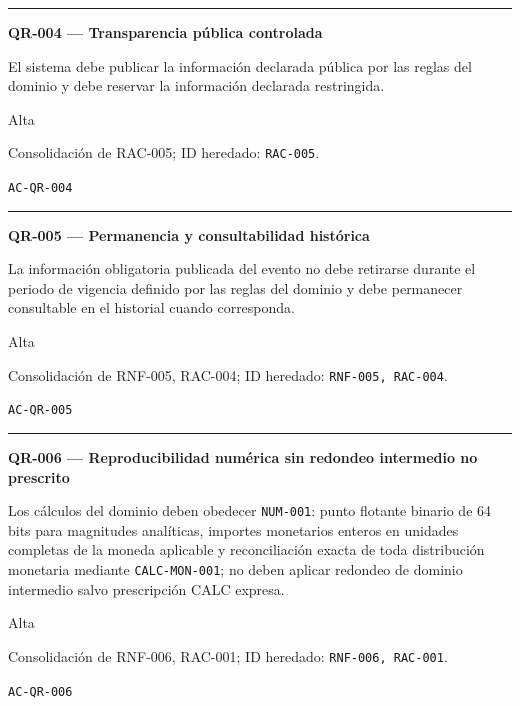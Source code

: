 \documentclass[10pt,letterpaper]{article}
\begin{document}
\vspace{0.25em}\hrule\vspace{0.65em}
\noindent\textbf{QR-004 --- Transparencia pública controlada}\par
\begin{description}[style=nextline,leftmargin=3.15cm,labelwidth=2.8cm,font=\normalfont\bfseries]
\item[Obligación] El sistema debe publicar la información declarada pública por las reglas del dominio y debe reservar la información declarada restringida.
\item[Prioridad] Alta
\item[Procedencia] Consolidación de RAC-005; ID heredado: \texttt{RAC-005}.
\item[Verificación] \texttt{AC-QR-004}
\end{description}
\vspace{0.25em}\hrule\vspace{0.65em}
\noindent\textbf{QR-005 --- Permanencia y consultabilidad histórica}\par
\begin{description}[style=nextline,leftmargin=3.15cm,labelwidth=2.8cm,font=\normalfont\bfseries]
\item[Obligación] La información obligatoria publicada del evento no debe retirarse durante el periodo de vigencia definido por las reglas del dominio y debe permanecer consultable en el historial cuando corresponda.
\item[Prioridad] Alta
\item[Procedencia] Consolidación de RNF-005, RAC-004; ID heredado: \texttt{RNF-005, RAC-004}.
\item[Verificación] \texttt{AC-QR-005}
\end{description}
\vspace{0.25em}\hrule\vspace{0.65em}
\noindent\textbf{QR-006 --- Reproducibilidad numérica sin redondeo intermedio no prescrito}\par
\begin{description}[style=nextline,leftmargin=3.15cm,labelwidth=2.8cm,font=\normalfont\bfseries]
\item[Obligación] Los cálculos del dominio deben obedecer \texttt{NUM-001}: punto flotante binario de 64 bits para magnitudes analíticas, importes monetarios enteros en unidades completas de la moneda aplicable y reconciliación exacta de toda distribución monetaria mediante \texttt{CALC-MON-001}; no deben aplicar redondeo de dominio intermedio salvo prescripción CALC expresa.
\item[Prioridad] Alta
\item[Procedencia] Consolidación de RNF-006, RAC-001; ID heredado: \texttt{RNF-006, RAC-001}.
\item[Verificación] \texttt{AC-QR-006}
\end{description}
\end{document}
